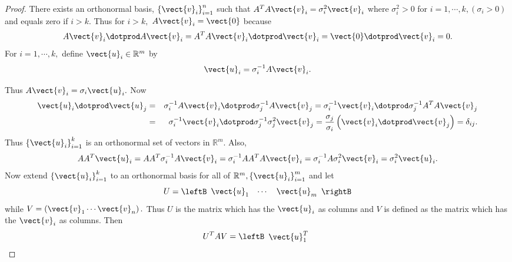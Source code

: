 \begin{proof}
There exists an orthonormal basis, $\left\{ \vect{v}_{i}\right\} _{i=1}^{n}$ such that $
A^TA\vect{v}_{i}=\sigma _{i}^{2}\vect{v}_{i}$ where $\sigma
_{i}^{2}>0$ for $i=1,\cdots ,k,\left( \sigma _{i}>0\right) $ and equals zero
if $i>k.$ Thus for $i>k,$ $A\vect{v}_{i}=\vect{0}$ because 
\begin{equation*}
 A\vect{v}_{i}\dotprod A\vect{v}_{i} = A^TA\vect{v}_{i} \dotprod \vect{v}_{i}  = \vect{0} \dotprod \vect{v}_{i} =0.
\end{equation*}
For $i=1,\cdots ,k,$ define $\vect{u}_{i}\in \mathbb{R}^{m}$ by 
\begin{equation*}
\vect{u}_{i}= \sigma _{i}^{-1}A\vect{v}_{i}.
\end{equation*}

Thus $A\vect{v}_{i}=\sigma _{i}\vect{u}_{i}.$ Now 
\begin{eqnarray*}
\vect{u}_{i} \dotprod \vect{u}_{j} &=&  \sigma _{i}^{-1}A
\vect{v}_{i} \dotprod \sigma _{j}^{-1}A\vect{v}_{j}  = \sigma_{i}^{-1}\vect{v}_{i} \dotprod \sigma _{j}^{-1}A^TA\vect{v}_{j} \\
&=& \sigma _{i}^{-1}\vect{v}_{i} \dotprod \sigma _{j}^{-1}\sigma _{j}^{2} \vect{v}_{j} =
\frac{\sigma _{j}}{\sigma _{i}}\left( \vect{v}_{i} \dotprod \vect{v}_{j}\right)
=\delta _{ij}.
\end{eqnarray*}
Thus $\left\{ \vect{u}_{i}\right\} _{i=1}^{k}$ is an orthonormal set of
vectors in $\mathbb{R}^{m}.$ Also, 
\begin{equation*}
AA^T\vect{u}_{i}=AA^T\sigma _{i}^{-1}A\vect{v}_{i}=\sigma
_{i}^{-1}AA^TA\vect{v}_{i}=\sigma _{i}^{-1}A\sigma _{i}^{2}\vect{v}
_{i}=\sigma _{i}^{2}\vect{u}_{i}.
\end{equation*}
Now extend $\left\{ \vect{u}_{i}\right\} _{i=1}^{k}$ to an orthonormal
basis for all of $\mathbb{R}^{m},\left\{ \vect{u}_{i}\right\} _{i=1}^{m}$
and let 
\begin{equation*}
U= \leftB 
\begin{array}{ccc}
\vect{u}_{1} & \cdots & \vect{u}_{m}
\end{array}
\rightB
\end{equation*}
while $V= \left( \vect{v}_{1}\cdots \vect{v}_{n}\right) .$ Thus $U$
is the matrix which has the $\vect{u}_{i}$ as columns and $V$ is defined
as the matrix which has the $\vect{v}_{i}$ as columns. Then 
\begin{equation*}
U^TAV=\leftB 
\begin{array}{c}
\vect{u}_{1}^T \\ 

\end{array}
\end{equation*}
\end{proof}
